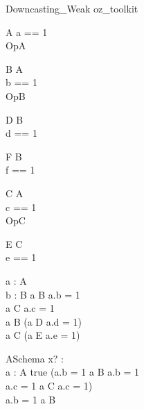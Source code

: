 \begin{zsection}
  \SECTION Downcasting\_Weak \parents oz\_toolkit
\end{zsection}

\begin{class}{A}
 a == 1\\
 OpA 
\end{class}

\begin{class}{B}
 A\\
 b == 1\\
 OpB \sdef [x? : \nat]
\end{class}

\begin{class}{D}
 B\\
 d == 1
\end{class}

\begin{class}{F}
 B\\
 f == 1
\end{class}

\begin{class}{C}
 A\\
 c == 1\\
 OpC \sdef [x? : \nat]
\end{class}

\begin{class}{E}
  C\\
  e == 1
\end{class}

\begin{axdef}
  a : \poly A\\
  b : B
\where
  a \in B \implies a.b = 1\\
  a \in C \implies a.c = 1\\
  a \in \poly B \implies (a \in D \implies a.d = 1)\\
  a \in \poly C \implies (a \in E \implies a.e = 1)\\
\end{axdef}

\begin{schema}{ASchema}
  x? : \nat\\
  a : \poly A
\where
  true \land
  (a.b = 1 \land a \in B \land a.b = 1 \lor\\
   a.c = 1 \land a \in C \land a.c = 1)\\
  a.b = 1 \iff a \in \poly B\\
\end{schema}

